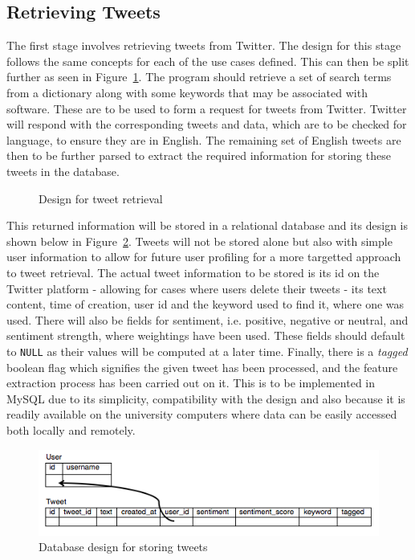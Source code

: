 \subsection{Retrieving Tweets}
\label{sec:arc1}
The first stage involves retrieving tweets from Twitter. The design for this stage follows the same concepts for each of the use cases defined. This can then be split further as seen in Figure~\ref{fig:phase1}. The program should retrieve a set of search terms from a dictionary along with some keywords that may be associated with software. These are to be used to form a request for tweets from Twitter. Twitter will respond with the corresponding tweets and data, which are to be checked for language, to ensure they are in English. The remaining set of English tweets are then to be further parsed to extract the required information for storing these tweets in the database.

\begin{figure}[h]
  \centering
  
  \caption{Design for tweet retrieval
    \label{fig:phase1}}
\end{figure}

This returned information will be stored in a relational database and its design is shown below in Figure~\ref{fig:db}. Tweets will not be stored alone but also with simple user information to allow for future user profiling for a more targetted approach to tweet retrieval. The actual tweet information to be stored is its id on the Twitter platform - allowing for cases where users delete their tweets - its text content, time of creation, user id and the keyword used to find it, where one was used. There will also be fields for sentiment, i.e. positive, negative or neutral, and sentiment strength, where weightings have been used. These fields should default to \texttt{NULL} as their values will be computed at a later time. Finally, there is a \emph{tagged} boolean flag which signifies the given tweet has been processed, and the feature extraction process has been carried out on it. This is to be implemented in MySQL due to its simplicity, compatibility with the design and also because it is readily available on the university computers where data can be easily accessed both locally and remotely.

\begin{figure}[h]
\begin{center}
\includegraphics[width=12cm]{db}
\end{center}
\caption{Database design for storing tweets}
\label{fig:db}
\end{figure}

